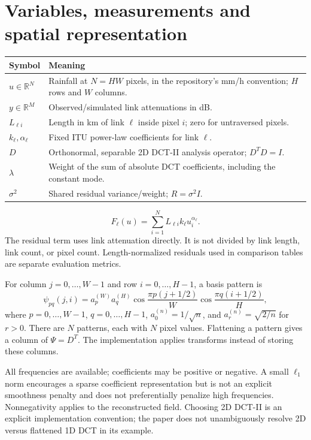 \documentclass[11pt,a4paper]{article}
\newcommand{\R}{\mathbb R}
\begin{document}
\section{Variables, measurements and spatial representation}
\begin{tabular}{p{.16\linewidth}p{.77\linewidth}}\toprule
Symbol & Meaning\\\midrule
$u\in\R^N$ & Rainfall at $N=HW$ pixels, in the repository's mm/h convention; $H$ rows and $W$ columns.\\
$y\in\R^M$ & Observed/simulated link attenuations in dB.\\
$L_{\ell i}$ & Length in km of link $\ell$ inside pixel $i$; zero for untraversed pixels.\\
$k_\ell,\alpha_\ell$ & Fixed ITU power-law coefficients for link $\ell$.\\
$D$ & Orthonormal, separable 2D DCT-II analysis operator; $D^TD=I$.\\
$\lambda$ & Weight of the sum of absolute DCT coefficients, including the constant mode.\\
$\sigma^2$ & Shared residual variance/weight; $R=\sigma^2 I$.\\\bottomrule
\end{tabular}
\begin{equation}
 F_\ell(u)=\sum_{i=1}^N L_{\ell i}k_\ell u_i^{\alpha_\ell}.
\end{equation}
The residual term uses link attenuation directly. It is not divided by link length, link count, or pixel count. Length-normalized residuals used in comparison tables are separate evaluation metrics.

For column $j=0,\ldots,W-1$ and row $i=0,\ldots,H-1$, a basis pattern is
\begin{equation}
 \psi_{pq}(j,i)=a_p^{(W)}a_q^{(H)}
 \cos\!\frac{\pi p(j+1/2)}{W}\cos\!\frac{\pi q(i+1/2)}{H},
\end{equation}
where $p=0,\ldots,W-1$, $q=0,\ldots,H-1$, $a_0^{(n)}=1/\sqrt n$, and $a_r^{(n)}=\sqrt{2/n}$ for $r>0$. There are $N$ patterns, each with $N$ pixel values. Flattening a pattern gives a column of $\Psi=D^T$. The implementation applies transforms instead of storing these columns.

All frequencies are available; coefficients may be positive or negative. A small $\ell_1$ norm encourages a sparse coefficient representation but is not an explicit smoothness penalty and does not preferentially penalize high frequencies. Nonnegativity applies to the reconstructed field. Choosing 2D DCT-II is an explicit implementation convention; the paper does not unambiguously resolve 2D versus flattened 1D DCT in its example.
\end{document}
